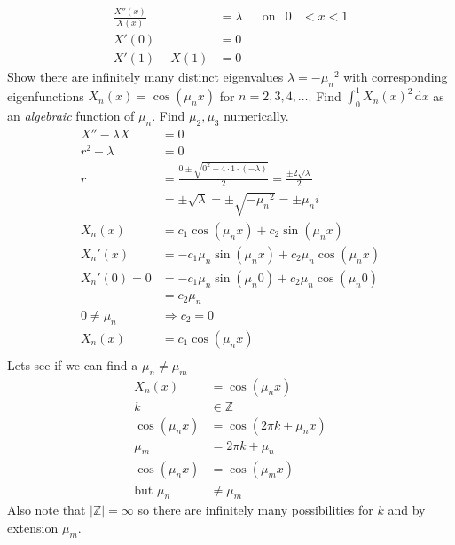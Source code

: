 \documentclass{article}
\begin{document}
\begin{align*}
  \frac{X''(x)}{X(x)}&=\lambda&&\text{on}&0&<x<1\\
  X'(0)&=0\\
  X'(1)-X(1)&=0
\end{align*}
Show there are infinitely many distinct eigenvalues $\lambda=-{\mu_n}^2$ with corresponding eigenfunctions $X_n(x)=\cos(\mu_nx)$ for $n=2,3,4,\dots$. Find $\int_0^1{X_n(x)^2\,\mathrm{d}x}$ as an \emph{algebraic} function of $\mu_n$. Find $\mu_2,\mu_3$ numerically.
\begin{align*}
  X''-\lambda X&=0\\
  r^2-\lambda&=0\\
  r&=\frac{0\pm\sqrt{0^2-4\cdot1\cdot(-\lambda)}}{2}=\frac{\pm2\sqrt{\lambda}}{2}\\
  &=\pm\sqrt{\lambda}=\pm\sqrt{-{\mu_n}^2}=\pm\mu_ni\\
  X_n(x)&=c_1\cos(\mu_n x)+c_2\sin(\mu_n x)\\
  {X_n}'(x)&=-c_1\mu_n\sin(\mu_nx)+c_2\mu_n\cos(\mu_nx)\\
  {X_n}'(0)=0&=-c_1\mu_n\sin(\mu_n0)+c_2\mu_n\cos(\mu_n0)\\
  &=c_2\mu_n\\
  0\ne\mu_n&\Rightarrow c_2=0\\
  X_n(x)&=c_1\cos(\mu_nx)\\
\end{align*}
Lets see if we can find a $\mu_n\ne\mu_m$
\begin{align*}
  X_n(x)&=\cos(\mu_n x)\\
  k&\in\mathbb{Z}\\
  \cos(\mu_n x)&=\cos(2\pi k+\mu_n x)\\
  \mu_m&=2\pi k+\mu_n\\
  \cos(\mu_n x)&=\cos(\mu_m x)\\
  \text{but }\mu_n&\ne\mu_m
\end{align*}
Also note that $\lvert\mathbb{Z}\rvert=\infty$ so there are infinitely many possibilities for $k$ and by extension $\mu_m$.
\end{document}
